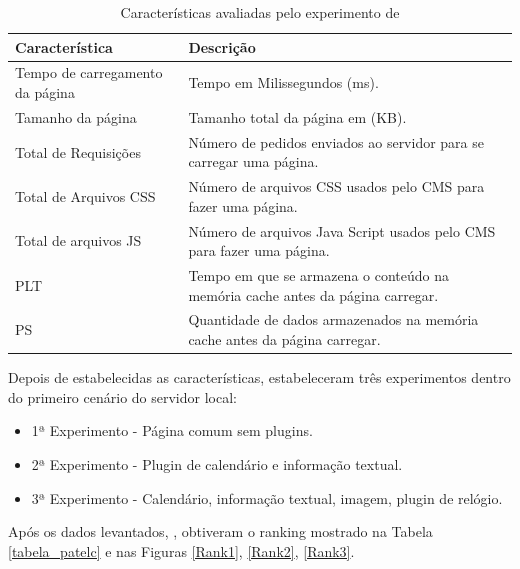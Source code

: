  	\begin{longtable}{|p{140pt}|p{300pt}|}
 	\caption{Características avaliadas pelo experimento de }
 	\label{patel}\\
 	\hline
 	 {\raggedright \textbf{Característica}}
 	 & {\raggedright \textbf{Descrição}}\\
 	\hline
 	 {\raggedright Tempo de carregamento da página}
 	 & {\raggedright Tempo em Milissegundos (ms).}\\
 	\hline
 	 {\raggedright Tamanho da página}
 	 & {\raggedright Tamanho total da página em (KB).}\\
 	\hline
 	 {\raggedright Total de Requisições} 
 	 & {\raggedright Número de pedidos enviados ao servidor para se carregar uma página.}\\
 	\hline
 	 {\raggedright Total de Arquivos CSS}
 	 & {\raggedright Número de arquivos CSS usados pelo CMS para fazer uma página.} \\
 	\hline
 	{\raggedright Total de arquivos JS} 
 	 & {\raggedright Número de arquivos Java Script usados pelo CMS para fazer uma página.}\\
 	\hline
 	{\raggedright PLT} 
 	 & {\raggedright Tempo em que se armazena o conteúdo na memória cache antes da página carregar.}\\
 	\hline
 	{\raggedright PS} 
 	 & {\raggedright Quantidade de dados armazenados na memória cache antes da página carregar.}\\
 	\hline
 	\end{longtable}
 	

Depois de estabelecidas as características,  estabeleceram três experimentos dentro do primeiro cenário do servidor local:

\begin{itemize}
\item 1ª Experimento - Página comum sem plugins.
\item 2ª Experimento - Plugin de calendário e informação textual.
\item 3ª Experimento - Calendário, informação textual, imagem, plugin de relógio.
\end{itemize}

Após os dados levantados, , obtiveram o ranking mostrado na Tabela \ref{tabela_patelc} e nas Figuras \ref{Rank1}, \ref{Rank2}, \ref{Rank3}.

